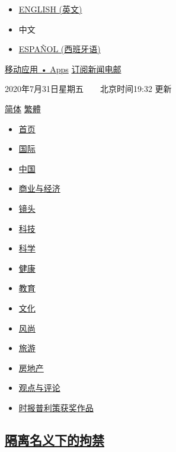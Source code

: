 \begin{itemize}
\tightlist
\item
  \href{http://www.nytimes.com/}{ENGLISH (英文)}
\item
  中文
\item
  \href{http://www.nytimes.com/es/}{ESPAÑOL (西班牙语)}
\end{itemize}

\href{/apps}{移动应用 • Apps} \textbar{}
\href{https://sso.nytcn.me/email/?source=top-right}{订阅新闻电邮}

2020年7月31日星期五~~~~北京时间19:32 更新

\href{https://cn.nytimes.com/tools/r.html?url=/\&langkey=zh-hans}{简体}
\textbar{}
\href{https://cn.nytimes.com/tools/r.html?url=/zh-hant/\&langkey=zh-hant}{繁體}

\begin{itemize}
\tightlist
\item
  \href{/}{首页}
\item
  \href{/world/}{国际}
\item
  \href{/china/}{中国}
\item
  \href{/business/}{商业与经济}
\item
  \href{/lens/}{镜头}
\item
  \href{/technology/}{科技}
\item
  \href{/science/}{科学}
\item
  \href{/health/}{健康}
\item
  \href{/education/}{教育}
\item
  \href{/culture/}{文化}
\item
  \href{/style/}{风尚}
\item
  \href{/travel/}{旅游}
\item
  \href{/real-estate/}{房地产}
\item
  \href{/opinion/}{观点与评论}
\item
  \href{//cn.nytimes.com/topic/20160427/pulitzers-topic/?utm_source=news\&utm_medium=nav\&utm_campaign=nav-topic-nyt-pulitzer-prize}{时报普利策获奖作品}
\end{itemize}

\hypertarget{ux9694ux79bbux540dux4e49ux4e0bux7684ux62d8ux7981}{%
\subsection{\texorpdfstring{\href{/china/20200731/coronavirus-china-qurantine/}{隔离名义下的拘禁}}{隔离名义下的拘禁}}\label{ux9694ux79bbux540dux4e49ux4e0bux7684ux62d8ux7981}}

